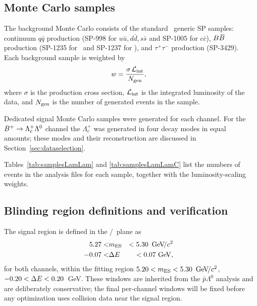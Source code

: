 \subsection{Monte Carlo samples}

The background Monte Carlo consists of the standard \babar\ generic SP
samples: continuum $q\bar{q}$ production (SP-998 for $u\bar{u}, d\bar{d},
s\bar{s}$ and SP-1005 for $c\bar{c}$), $B\kern 0.18em\overline{\kern -0.18em B}{}$ production (SP-1235 for
\BpBm\ and SP-1237 for \BzBzb), and $\tau^+\tau^-$ production (SP-3429).
Each background sample is weighted by
%
\begin{equation}
    w = \frac{\sigma \, \mathcal{L}_{\rm int}}{N_{\rm gen}},
\end{equation}
%
where $\sigma$ is the production cross section, $\mathcal{L}_{\rm int}$
is the integrated luminosity of the data, and $N_{\rm gen}$ is the number
of generated events in the sample.

Dedicated signal Monte Carlo samples were generated for each channel. For
the $B^+ \rightarrow \Lambda_c^+ \Lambda^0$ channel the $\Lambda_c^+$ was
generated in four decay modes in equal amounts; these modes and their
reconstruction are discussed in Section~\ref{sec:dataselection}.

Tables~\ref{tab:samplesLamLam} and \ref{tab:samplesLamLamC} list the
numbers of events in the analysis files for each sample, together with
the luminosity-scaling weights.





\subsection{Blinding region definitions and verification}
\label{sec:blinding}

The signal region is defined in the \mes/\DeltaE\ plane as
%
\begin{eqnarray}
    5.27 < & \mbox{$m_{\rm ES}$} & < 5.30~{\mathrm{\,Ge\kern -0.1em V\!/}c^2} \nonumber \\
    -0.07 < & \mbox{$\Delta E$} & < 0.07~{\rm GeV},
\end{eqnarray}
%
for both channels, within the fitting region
$5.20 < \mbox{$m_{\rm ES}$} < 5.30~{\mathrm{\,Ge\kern -0.1em V\!/}c^2}$,
$-0.20 < \mbox{$\Delta E$} < 0.20$~GeV.
These windows are inherited from the $\bar{p}\Lambda^0$ analysis and are
deliberately conservative; the final per-channel windows will be fixed
before any optimization uses collision data near the signal region.

